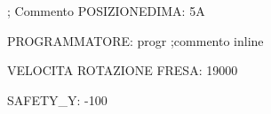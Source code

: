 ; Commento
POSIZIONEDIMA:            5A

PROGRAMMATORE:            progr    ;commento inline

VELOCITA ROTAZIONE FRESA: 19000

SAFETY_Y: -100
